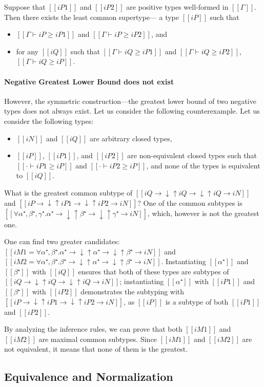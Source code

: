 \begin{property}
  Suppose that $[[iP1]]$ and $[[iP2]]$ are positive types
  well-formed in $[[Γ]]$.
  Then there exists the least common supertype--- a type $[[iP]]$ such that
  \begin{itemize}
    \item $[[Γ ⊢ iP ≥ iP1]]$ and $[[Γ ⊢ iP ≥ iP2]]$, and 
    \item for any $[[iQ]]$ such that $[[Γ ⊢ iQ ≥ iP1]]$ and $[[Γ ⊢ iQ ≥ iP2]]$,
      $[[Γ ⊢ iQ ≥ iP]]$.
  \end{itemize}
\end{property}

\paragraph{Negative Greatest Lower Bound does not exist}
However, the symmetric construction---the greatest lower bound of two negative types
does not always exist. Let us consider the following counterexample.
Let us consider the following types: 
\begin{itemize}
  \item $[[iN]]$ and $[[iQ]]$ are arbitrary closed types, 
  \item $[[iP]]$, $[[iP1]]$, and $[[iP2]]$ are non-equivalent closed types 
    such that $[[· ⊢ iP1 ≥ iP]]$ and $[[· ⊢ iP2 ≥ iP]]$, and 
    none of the types is equivalent to $[[iQ]]$.
\end{itemize}
What is the greatest common subtype of  
$[[iQ → ↓↑iQ → ↓↑iQ → iN]]$ and $[[iP → ↓↑iP1 → ↓↑iP2 → iN]]$?
One of the common subtypes is $[[∀α⁺,β⁺,γ⁺. α⁺ → ↓↑β⁺ → ↓↑γ⁺ → iN]]$,
which, however is not the greatest one.  

One can find two greater candidates:
$[[iM1 = ∀α⁺,β⁺. α⁺ → ↓↑α⁺ → ↓↑β⁺ → iN]]$ and $[[iM2 = ∀α⁺,β⁺. β⁺ → ↓↑α⁺ → ↓↑β⁺ → iN]]$.
Instantiating $[[α⁺]]$ and $[[β⁺]]$ with $[[iQ]]$ ensures 
that both of these types are subtypes of $[[iQ → ↓↑iQ → ↓↑iQ → iN]]$;
instantiating $[[α⁺]]$ with $[[iP1]]$ and $[[β⁺]]$ with $[[iP2]]$
demonstrates the subtyping with $[[iP → ↓↑iP1 → ↓↑iP2 → iN]]$,
as $[[iP]]$ is a subtype of both $[[iP1]]$ and $[[iP2]]$.

By analyzing the inference rules, we can prove that
both $[[iM1]]$ and $[[iM2]]$ are maximal common subtypes.
Since $[[iM1]]$ and $[[iM2]]$ are not equivalent,
it means that none of them is the greatest.


\subsection{Equivalence and Normalization}
\label{sec:decl-equivalence}

